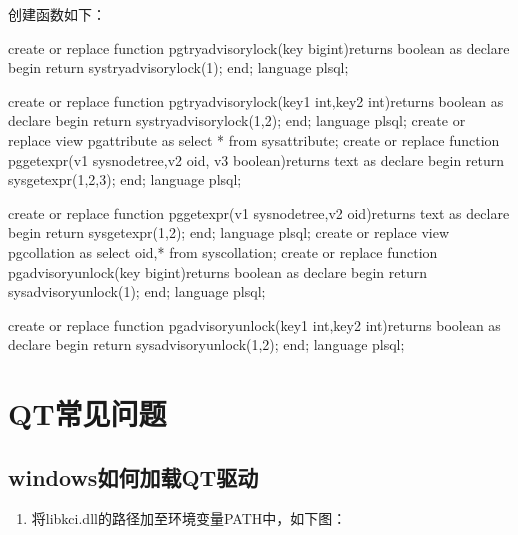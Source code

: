 \documentclass[letterpaper,10pt,english]{sphinxmanual}
\begin{document}
创建函数如下：

\begin{sphinxVerbatim}[commandchars=\\\{\}]
create or replace function pg\PYGZus{}try\PYGZus{}advisory\PYGZus{}lock(key bigint)returns boolean
       as \PYGZdl{}\PYGZdl{}
       declare
       begin
       return sys\PYGZus{}try\PYGZus{}advisory\PYGZus{}lock(\PYGZdl{}1);
       end;
       \PYGZdl{}\PYGZdl{}language plsql;

       create or replace function pg\PYGZus{}try\PYGZus{}advisory\PYGZus{}lock(key1 int,key2 int)returns boolean
       as \PYGZdl{}\PYGZdl{}
       declare
begin
 return sys\PYGZus{}try\PYGZus{}advisory\PYGZus{}lock(\PYGZdl{}1,\PYGZdl{}2);
end;
\PYGZdl{}\PYGZdl{}language plsql;
create or replace view pg\PYGZus{}attribute as select * from sys\PYGZus{}attribute;
create or replace function pg\PYGZus{}get\PYGZus{}expr(v1 sys\PYGZus{}node\PYGZus{}tree,v2  oid, v3 boolean)returns text
as \PYGZdl{}\PYGZdl{}
declare
begin
 return sys\PYGZus{}get\PYGZus{}expr(\PYGZdl{}1,\PYGZdl{}2,\PYGZdl{}3);
end;
\PYGZdl{}\PYGZdl{}language plsql;

create or replace function pg\PYGZus{}get\PYGZus{}expr(v1 sys\PYGZus{}node\PYGZus{}tree,v2  oid)returns text
as \PYGZdl{}\PYGZdl{}
declare
begin
 return sys\PYGZus{}get\PYGZus{}expr(\PYGZdl{}1,\PYGZdl{}2);
end;
\PYGZdl{}\PYGZdl{}language plsql;
create or replace view pg\PYGZus{}collation as select oid,* from sys\PYGZus{}collation;
create or replace function pg\PYGZus{}advisory\PYGZus{}unlock(key bigint)returns boolean
as \PYGZdl{}\PYGZdl{}
declare
begin
 return sys\PYGZus{}advisory\PYGZus{}unlock(\PYGZdl{}1);
end;
\PYGZdl{}\PYGZdl{}language plsql;

create or replace function pg\PYGZus{}advisory\PYGZus{}unlock(key1 int,key2 int)returns boolean
as \PYGZdl{}\PYGZdl{}
declare
begin
 return sys\PYGZus{}advisory\PYGZus{}unlock(\PYGZdl{}1,\PYGZdl{}2);
end;
\PYGZdl{}\PYGZdl{}language plsql;
\end{sphinxVerbatim}


\section{QT常见问题}
\label{\detokenize{interface/qt:qt}}\label{\detokenize{interface/qt::doc}}

\subsection{windows如何加载QT驱动}
\label{\detokenize{interface/qt:windowsqt}}\begin{enumerate}
%
\item {} 
将libkci.dll的路径加至环境变量PATH中，如下图：

\end{enumerate}
\end{document}
